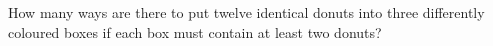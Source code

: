 How many ways are there to put twelve identical donuts into three differently coloured boxes if each box must contain at least two donuts?
